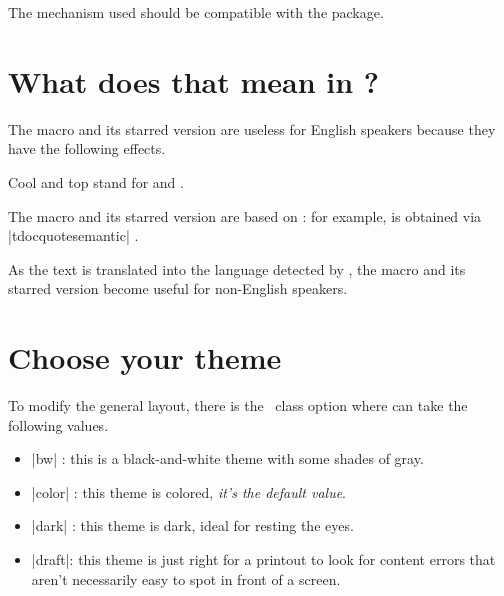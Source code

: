 \begin{tdocnote}
    The mechanism used should be compatible with the  package.
\end{tdocnote}


\section{What does that mean in ?}

The macro  and its starred version are useless for English speakers because they have the following effects.


\begin{tdoclatex}
Cool and top stand for  and .
\end{tdoclatex}


The macro  and its starred version are based on  : for example,  is obtained via \tdocinlatex|tdocquote{semantic}| .


\begin{tdocnote}
    As the text  is translated into the language detected by \thisproj, the macro  and its starred version become useful for non-English speakers.
\end{tdocnote}


\section{Choose your theme}

To modify the general layout, there is the \thisproj\ class option  where  can take the following values.

\begin{itemize}
    \item \tdocinlatex|bw| :
    this is a black-and-white theme with some shades of gray.

    \item \tdocinlatex|color| :
    this theme is colored, \emph{it's the default value}.

    \item \tdocinlatex|dark| :
    this theme is dark, ideal for resting the eyes.

    \item \tdocinlatex|draft|:
    this theme is just right for a printout to look for content errors that aren't necessarily easy to spot in front of a screen.
\end{itemize}


